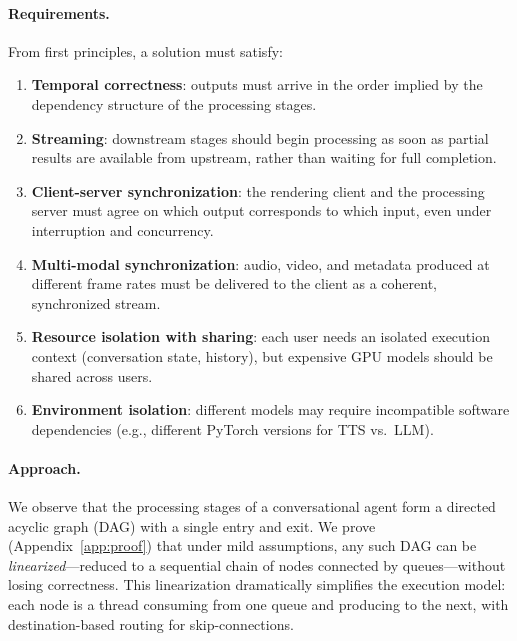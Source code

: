 \documentclass[11pt,a4paper]{article}
\begin{document}
\paragraph{Requirements.}
From first principles, a solution must satisfy:
\begin{enumerate}[nosep]
    \item \textbf{Temporal correctness}: outputs must arrive in the order implied by the dependency structure of the processing stages.
    \item \textbf{Streaming}: downstream stages should begin processing as soon as partial results are available from upstream, rather than waiting for full completion.
    \item \textbf{Client-server synchronization}: the rendering client and the processing server must agree on which output corresponds to which input, even under interruption and concurrency.
    \item \textbf{Multi-modal synchronization}: audio, video, and metadata produced at different frame rates must be delivered to the client as a coherent, synchronized stream.
    \item \textbf{Resource isolation with sharing}: each user needs an isolated execution context (conversation state, history), but expensive GPU models should be shared across users.
    \item \textbf{Environment isolation}: different models may require incompatible software dependencies (e.g., different PyTorch versions for TTS vs.\ LLM).
\end{enumerate}

\paragraph{Approach.}
We observe that the processing stages of a conversational agent form a directed acyclic graph (DAG) with a single entry and exit. We prove (Appendix~\ref{app:proof}) that under mild assumptions, any such DAG can be \emph{linearized}---reduced to a sequential chain of nodes connected by queues---without losing correctness. This linearization dramatically simplifies the execution model: each node is a thread consuming from one queue and producing to the next, with destination-based routing for skip-connections.
\end{document}
